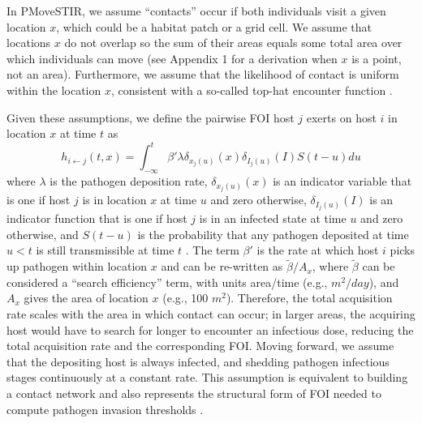 \documentclass[letterpaper]{article}
\begin{document}
In PMoveSTIR, we assume ``contacts'' occur if both individuals visit a given location $x$, which could be a habitat patch or a grid cell. 
We assume that locations $x$ do not overlap so the sum of their areas equals some total area over which individuals can move (see Appendix 1 for a derivation when $x$ is a point, not an area). 
Furthermore, we assume that the likelihood of contact is uniform within the location $x$, consistent with a so-called top-hat encounter function \citep{Gurarie2013,Wilber2022}.

Given these assumptions, we define the pairwise FOI host $j$ exerts on host $i$ in location $x$ at time $t$ as \citep{Wilber2022}
\begin{equation}
    h_{i \leftarrow j}(t, x) = \int_{-\infty}^{t} \beta' \lambda \delta_{x_j(u)}(x) \delta_{I_j(u)}(I) S(t - u) du
    \label{eq:original_foi}
\end{equation}
where $\lambda$ is the pathogen deposition rate, $\delta_{x_j(u)}(x)$ is an indicator variable that is one if host $j$ is in location $x$ at time $u$ and zero otherwise, $\delta_{I_j(u)}(I)$ is an indicator function that is one if host $j$ is in an infected state at time $u$ and zero otherwise, and $S(t-u)$ is the probability that any pathogen deposited at time $u < t$ is still transmissible at time $t$ \citep[see][for a full derivation]{Wilber2022}. 
The term $\beta'$ is the rate at which host $i$ picks up pathogen within location $x$ and can be re-written as $\tilde{\beta} / A_x$, where $\tilde{\beta}$ can be considered a ``search efficiency'' term, with units area/time (e.g., $m^2 / day$), and $A_x$ gives the area of location $x$ (e.g., 100 $m^2$). 
Therefore, the total acquisition rate scales with the area in which contact can occur; in larger areas, the acquiring host would have to search for longer to encounter an infectious dose, reducing the total acquisition rate and the corresponding FOI. Moving forward, we assume that the depositing host is always infected, and shedding pathogen infectious stages continuously at a constant rate. This assumption is equivalent to building a contact network and also represents the structural form of FOI needed to compute pathogen invasion thresholds \citep{Wilber2022}.
\end{document}
